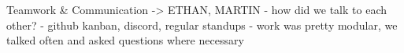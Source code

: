 Teamwork & Communication -> ETHAN, MARTIN
  - how did we talk to each other?
  - github kanban, discord, regular standups
  - work was pretty modular, we talked often and asked questions where necessary
